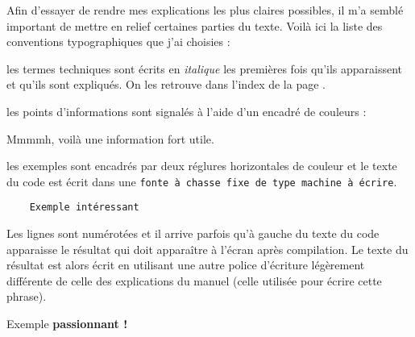 \vspace*{50\lineskip}
{\color{MarronLogo}
\hfill\fontsize{50}{15}\selectfont\bfseries{}
}
\vspace*{50\lineskip}


Afin d'essayer de rendre mes explications les plus claires possibles, il m'a semblé important de mettre en relief certaines parties du texte. Voilà ici la liste des conventions typographiques que j'ai choisies :\bigskip

\begin{description}\itemsep20pt
    \item[Vocabulaire spécifique :] les termes techniques sont écrits en \textit{italique} les premières fois qu'ils apparaissent et qu'ils sont expliqués. On les retrouve dans l'index de la page \pageref{index-jarg}.

    \item[Informations :] les points d'informations sont signalés à l'aide d'un encadré de couleurs :
        \begin{info}
            Mmmmh, voilà une information fort utile.
        \end{info}

    \item[Les exemples :] les exemples sont encadrés par deux réglures horizontales de couleur et le texte du code est écrit dans une \texttt{fonte à chasse fixe de type machine à écrire}.
{
\begin{Verbatim}
    Exemple intéressant
\end{Verbatim}
}

Les lignes sont numérotées et il arrive parfois qu'à gauche du texte du code apparaisse le résultat qui doit apparaître à l'écran après compilation. {\selectfont Le texte du résultat est alors écrit en utilisant une autre police d'écriture légèrement différente de celle des explications du manuel (celle utilisée pour écrire cette phrase).}
\end{description} \bigskip

{\NewFont
\begin{SideBySideExample}
    Exemple \textbf{passionnant !}
\end{SideBySideExample}
}\bigskip

